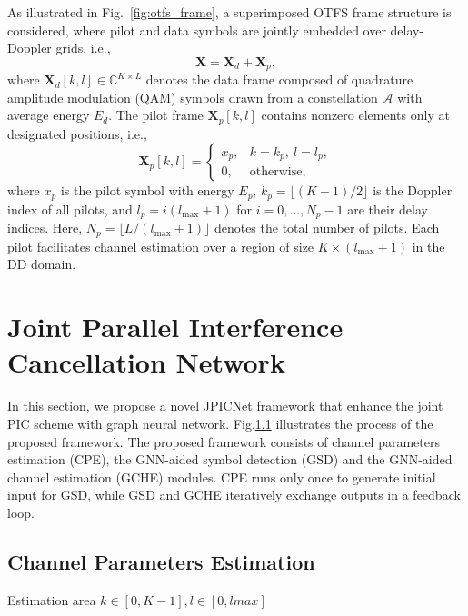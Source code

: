 \documentclass[journal]{IEEEtran}
\begin{document}
As illustrated in Fig.~\ref{fig:otfs_frame}, a superimposed OTFS frame structure is considered, where pilot and data symbols are jointly embedded over delay-Doppler grids, i.e.,
\begin{equation}
\mathbf{X} = \mathbf{X}_d + \mathbf{X}_p,
\end{equation}
where $\mathbf X_d[k, l] \in \mathbb{C}^{K \times L}$ denotes the data frame composed of quadrature amplitude modulation (QAM) symbols drawn from a constellation $\mathcal{A}$ with average energy $E_d$. The pilot frame $\mathbf X_p[k, l]$ contains nonzero elements only at designated positions, i.e.,
\begin{equation}
\mathbf X_p[k, l] =
\begin{cases}
x_p, & k = k_p,\ l = l_p, \\
0, & \text{otherwise},
\end{cases}
\end{equation}
where $x_p$ is the pilot symbol with energy $E_p$, $k_p = \lfloor (K-1)/2 \rfloor$ is the Doppler index of all pilots, and $l_p = i(l_\max + 1)$ for $i = 0, \dots, N_p - 1$ are their delay indices. Here, $N_p = \lfloor L / (l_\max + 1) \rfloor$ denotes the total number of pilots. Each pilot facilitates channel estimation over a region of size $K \times (l_\max + 1)$ in the DD domain.





\section{Joint Parallel Interference Cancellation Network}

In this section, we propose a novel JPICNet framework that enhance the joint PIC scheme with graph neural network. Fig.\ref{} illustrates the process of the proposed framework. The proposed framework consists of channel parameters estimation (CPE), the GNN-aided symbol detection (GSD) and the GNN-aided channel estimation (GCHE) modules. CPE runs only once to generate initial input for GSD, while GSD and GCHE iteratively exchange outputs in a feedback loop.

\subsection{Channel Parameters Estimation}
Estimation area $k \in [0, K-1], l \in [0, lmax]$
\end{document}
